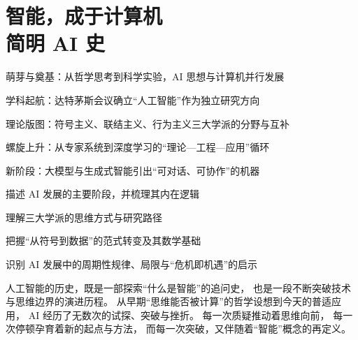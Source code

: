 
\chapter{智能，成于计算机\texorpdfstring{\\}{ }简明 AI 史}



\begin{introduction}  
  \item 萌芽与奠基：从哲学思考到科学实验，AI 思想与计算机并行发展
  \item 学科起航：达特茅斯会议确立“人工智能”作为独立研究方向
  \item 理论版图：符号主义、联结主义、行为主义三大学派的分野与互补
  \item 螺旋上升：从专家系统到深度学习的“理论—工程—应用”循环
  \item 新阶段：大模型与生成式智能引出“可对话、可协作”的机器
\end{introduction}


\begin{introduction}
  \item 描述 AI 发展的主要阶段，并梳理其内在逻辑
  \item 理解三大学派的思维方式与研究路径
  \item 把握“从符号到数据”的范式转变及其数学基础
  \item 识别 AI 发展中的周期性规律、局限与“危机即机遇”的启示
\end{introduction}

人工智能的历史，既是一部探索“什么是智能”的追问史，
也是一段不断突破技术与思维边界的演进历程。
从早期“思维能否被计算”的哲学设想到今天的普适应用，
AI 经历了无数次的试探、突破与挫折。  
每一次质疑推动着思维向前，
每一次停顿孕育着新的起点与方法，
而每一次突破，又伴随着“智能”概念的再定义。

